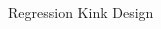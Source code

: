 \documentclass[notes,11pt, aspectratio=169]{beamer}
\begin{document}
\begin{frame}{Regression Kink Design}
\begin{columns}[onlytextwidth, T]
\begin{column}{.4\textwidth}
      \end{column}%
    \end{columns}  
\end{frame}
\end{document}
